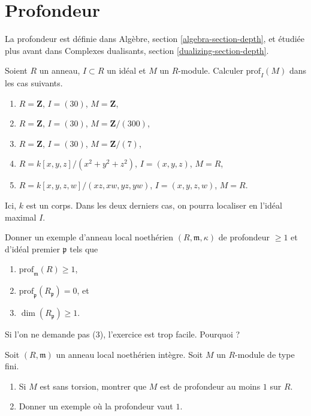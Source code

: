 \section{Profondeur}
\label{section-depth}

\noindent
La profondeur est définie dans Algèbre, section \ref{algebra-section-depth},
et étudiée plus avant dans
Complexes dualisants, section \ref{dualizing-section-depth}.

\begin{exercise}
\label{exercise-compute-depth}
Soient $R$ un anneau, $I \subset R$ un idéal et $M$ un $R$-module.
Calculer $\text{prof}_I(M)$ dans les cas suivants.
\begin{enumerate}
\item $R = \mathbf{Z}$, $I = (30)$, $M = \mathbf{Z}$,
\item $R = \mathbf{Z}$, $I = (30)$, $M = \mathbf{Z}/(300)$,
\item $R = \mathbf{Z}$, $I = (30)$, $M = \mathbf{Z}/(7)$,
\item $R = k[x, y, z]/(x^2 + y^2 + z^2)$, $I = (x, y, z)$, $M = R$,
\item $R = k[x, y, z, w]/(xz, xw, yz, yw)$, $I = (x, y, z, w)$,
$M = R$.
\end{enumerate}
Ici, $k$ est un corps. Dans les deux derniers cas, on pourra localiser
en l'idéal maximal $I$.
\end{exercise}

\begin{exercise}
\label{exercise-depth-not-inherited-localization}
Donner un exemple d'anneau local noethérien $(R, \mathfrak m, \kappa)$
de profondeur $\geq 1$ et d'idéal premier $\mathfrak p$ tels que
\begin{enumerate}
\item $\text{prof}_\mathfrak m(R) \geq 1$,
\item $\text{prof}_\mathfrak p(R_\mathfrak p) = 0$, et
\item $\dim(R_\mathfrak p) \geq 1$.
\end{enumerate}
Si l'on ne demande pas (3), l'exercice est trop facile. Pourquoi ?
\end{exercise}

\begin{exercise}
\label{exercise-depth-torsion-free}
Soit $(R, \mathfrak m)$ un anneau local noethérien intègre.
Soit $M$ un $R$-module de type fini.
\begin{enumerate}
\item Si $M$ est sans torsion, montrer que $M$ est de profondeur au moins $1$ sur $R$.
\item Donner un exemple où la profondeur vaut $1$.
\end{enumerate}
\end{exercise}

